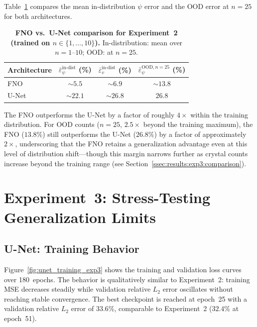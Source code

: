 Table~\ref{tab:comparison_exp2} compares the mean in-distribution $\psi$ error and the OOD
error at $n = 25$ for both architectures.

\begin{table}[htbp]
\centering
\caption{\textbf{FNO vs.\ U-Net comparison for Experiment~2 (trained on $n \in \{1,\ldots,10\}$).}
         In-distribution: mean over $n = 1$–$10$; OOD: at $n = 25$.}
\label{tab:comparison_exp2}
\begin{tabular}{lccc}
\toprule
\textbf{Architecture} & $\bar{\varepsilon}_\psi^{\text{in-dist}}$ (\%) & $\bar{\varepsilon}_v^{\text{in-dist}}$ (\%) & $\bar{\varepsilon}_\psi^{\text{OOD}, n=25}$ (\%) \\
\midrule
FNO   & $\sim 5.5$ & $\sim 6.9$ & $\sim 13.8$ \\
U-Net & $\sim 22.1$ & $\sim 26.8$ & $26.8$ \\
\bottomrule
\end{tabular}
\end{table}

The FNO outperforms the U-Net by a factor of roughly $4\times$ within the training distribution. For OOD counts ($n = 25$, $2.5\times$ beyond the training maximum), the FNO ($13.8\%$) still outperforms the U-Net ($26.8\%$) by a factor of approximately $2\times$, underscoring that the FNO retains a generalization advantage even at this level of distribution shift—though this margin narrows further as crystal counts increase beyond the training range (see Section~\ref{ssec:results:exp3:comparison}).

\section{Experiment~3: Stress-Testing Generalization Limits}
\label{sec:results:exp3}

\subsection{U-Net: Training Behavior}
\label{ssec:results:exp3:unet:training}

Figure~\ref{fig:unet_training_exp3} shows the training and validation loss curves over 180~epochs. The behavior is qualitatively similar to Experiment~2: training MSE decreases steadily while validation relative $L_2$ error oscillates without reaching stable convergence. The best checkpoint is reached at epoch~25 with a validation relative $L_2$ error of $33.6\%$, comparable to Experiment~2 ($32.4\%$ at epoch~51).


